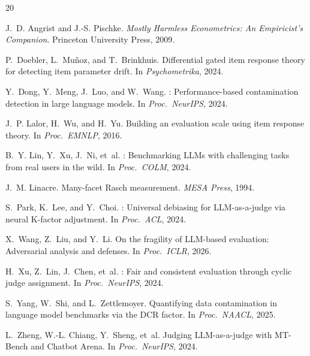 \documentclass[11pt,twocolumn]{article}
\begin{document}

\begin{thebibliography}{20}

J.~D. Angrist and J.-S. Pischke.
\newblock \emph{Mostly Harmless Econometrics: An Empiricist's Companion}.
\newblock Princeton University Press, 2009.

P.~Doebler, L.~Mu\~{n}oz, and T.~Brinkhuis.
\newblock Differential gated item response theory for detecting item parameter drift.
\newblock In \emph{Psychometrika}, 2024.

Y.~Dong, Y.~Meng, J.~Luo, and W.~Wang.
: Performance-based contamination detection in large language models.
\newblock In \emph{Proc.\ NeurIPS}, 2024.

J.~P. Lalor, H.~Wu, and H.~Yu.
\newblock Building an evaluation scale using item response theory.
\newblock In \emph{Proc.\ EMNLP}, 2016.

B.~Y. Lin, Y.~Xu, J.~Ni, et~al.
: Benchmarking {LLMs} with challenging tasks from real users in the wild.
\newblock In \emph{Proc.\ COLM}, 2024.

J.~M. Linacre.
\newblock Many-facet {R}asch measurement.
\newblock \emph{MESA Press}, 1994.

S.~Park, K.~Lee, and Y.~Choi.
: Universal debiasing for {LLM}-as-a-judge via neural {K}-factor adjustment.
\newblock In \emph{Proc.\ ACL}, 2024.

X.~Wang, Z.~Liu, and Y.~Li.
\newblock On the fragility of {LLM}-based evaluation: Adversarial analysis and defenses.
\newblock In \emph{Proc.\ ICLR}, 2026.

H.~Xu, Z.~Lin, J.~Chen, et~al.
: Fair and consistent evaluation through cyclic judge assignment.
\newblock In \emph{Proc.\ NeurIPS}, 2024.

S.~Yang, W.~Shi, and L.~Zettlemoyer.
\newblock Quantifying data contamination in language model benchmarks via the {DCR} factor.
\newblock In \emph{Proc.\ NAACL}, 2025.

L.~Zheng, W.-L. Chiang, Y.~Sheng, et~al.
\newblock Judging {LLM}-as-a-judge with {MT-Bench} and {Chatbot Arena}.
\newblock In \emph{Proc.\ NeurIPS}, 2024.

\end{thebibliography}
\end{document}
